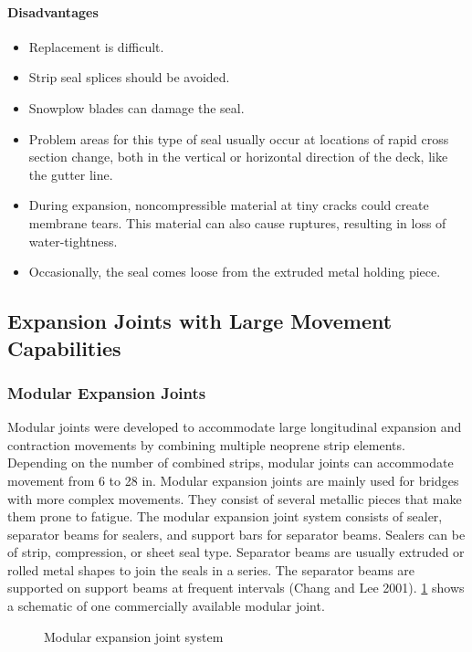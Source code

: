 \paragraph*{Disadvantages}
\begin{itemize}
  \item Replacement is difficult.
  \item Strip seal splices should be avoided.
  \item Snowplow blades can damage the seal.
  \item Problem areas for this type of seal usually occur at locations of rapid cross section change, both in the vertical or horizontal direction of the deck, like the gutter line.
  \item During expansion, noncompressible material at tiny cracks could create membrane tears. This material can also cause ruptures, resulting in loss of water-tightness.
  \item Occasionally, the seal comes loose from the extruded metal holding piece.
\end{itemize}

\subsection{Expansion Joints with Large Movement Capabilities}
\subsubsection{Modular Expansion Joints}
Modular joints were developed to accommodate large longitudinal expansion and contraction movements by
combining multiple neoprene strip elements. Depending on the number of combined strips, modular joints can
accommodate movement from 6 to 28 in. Modular expansion joints are mainly used for bridges with more complex
movements. They consist of several metallic pieces that make them prone to fatigue. The modular expansion joint
system consists of sealer, separator beams for sealers, and support bars for separator beams. Sealers can be of strip,
compression, or sheet seal type. Separator beams are usually extruded or rolled metal shapes to join the seals in a
series. The separator beams are supported on support beams at frequent intervals (Chang and Lee 2001). \cref{fig:modular-expansion-joint}
shows a schematic of one commercially available modular joint.

\begin{figure}
  \caption{Modular expansion joint system}
  \label{fig:modular-expansion-joint}
\end{figure}

